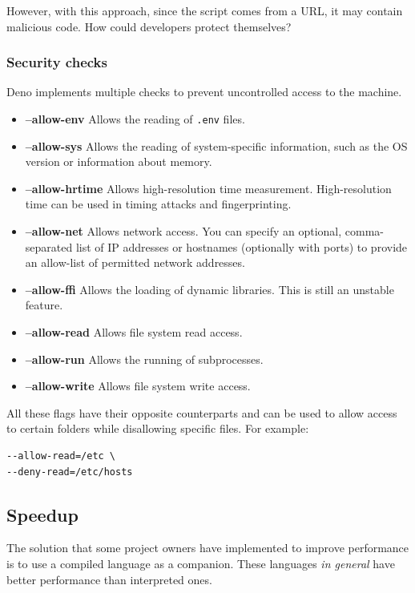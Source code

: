 \documentclass[10pt,journal,compsoc]{IEEEtran}
\begin{document}
However, with this approach, since the script comes from a URL, it may contain malicious code. How could developers protect themselves?

\subsubsection{Security checks}

Deno implements multiple checks to prevent uncontrolled access to the machine. \cite{DenoSec}

\begin{itemize}
    \item \textbf{--allow-env} Allows the reading of \verb|.env| files.
    \item \textbf{--allow-sys} Allows the reading of system-specific information, such as the OS version or information about memory.
    \item \textbf{--allow-hrtime} Allows high-resolution time measurement. High-resolution time can be used in timing attacks and fingerprinting.
    \item \textbf{--allow-net} Allows network access. You can specify an optional, comma-separated list of IP addresses or hostnames (optionally with ports) to provide an allow-list of permitted network addresses.
    \item \textbf{--allow-ffi} Allows the loading of dynamic libraries. This is still an unstable feature.
    \item \textbf{--allow-read} Allows file system read access.
    \item \textbf{--allow-run} Allows the running of subprocesses.
    \item \textbf{--allow-write} Allows file system write access.
\end{itemize}

All these flags have their opposite counterparts and can be used to allow access to certain folders while disallowing specific files. For example:

\begin{lstlisting}
--allow-read=/etc \
--deny-read=/etc/hosts
    \end{lstlisting}

\subsection{Speedup}

The solution that some project owners have implemented to improve performance is to use a compiled language as a companion. These languages \textit{in general} have better performance than interpreted ones.
\end{document}
